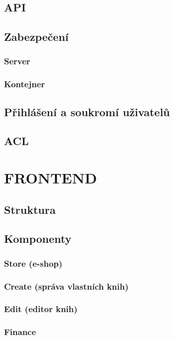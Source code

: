 \documentclass[a4paper,12pt,twoside,BCOR=10mm]{article}
\newcommand{\upc}[1]{\uppercase{#1}} %
\begin{document}
\subsection{API}
\subsection{Zabezpečení}
\subsubsection{Server}
\subsubsection{Kontejner}
\subsection{Přihlášení a soukromí uživatelů}
\subsection{ACL}

\section{\upc{Frontend}}\label{sec:frontend}
\subsection{Struktura}
\subsection{Komponenty}

\subsubsection{Store (e-shop)}\label{sec:store}
\subsubsection{Create (správa vlastních knih)}\label{sec:create}
\subsubsection{Edit (editor knih)}\label{sec:edit}
\subsubsection{Finance}\label{sec:finance}
\end{document}
